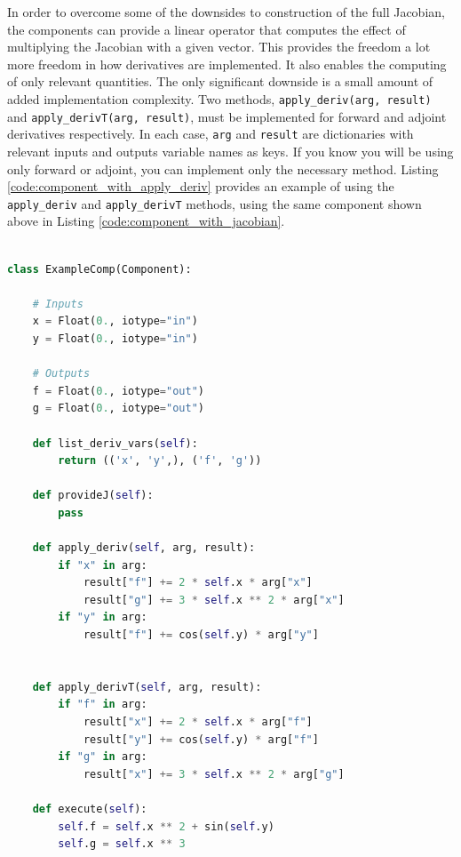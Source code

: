 \documentclass[]{aiaa-tc} %
\begin{document}
        In order to overcome some of the downsides to construction of the full Jacobian, the components can provide
        a linear operator that computes the effect of multiplying the Jacobian with a given vector. This provides
        the freedom a lot more freedom in how derivatives are implemented. It also enables the computing of only
        relevant quantities. The only significant downside is a small amount of added implementation complexity.
        Two methods, \texttt{apply\_deriv(arg, result)} and \texttt{apply\_derivT(arg, result)}, must be implemented
        for forward and adjoint derivatives respectively. In each case, \texttt{arg} and \texttt{result}
        are dictionaries with relevant inputs and outputs variable names as keys.
        If you know you will be using only forward or adjoint, you can implement only the
        necessary method. Listing \ref{code:component_with_apply_deriv} provides an example of
        using the \texttt{apply\_deriv} and \texttt{apply\_derivT} methods, using the same component shown above in
        Listing \ref{code:component_with_jacobian}.

\begin{minipage}{\linewidth}
\begin{lstlisting}[label=code:component_with_apply_deriv,caption=Example OpenMDAO
component with apply\_deriv and apply\_derivT methods implemented,
language=Python , basicstyle=\ttfamily\scriptsize,
           keywordstyle=\color{blue}\ttfamily,
           stringstyle=\color{red}\ttfamily, showstringspaces=false,
           commentstyle=\color{olive}\ttfamily]

class ExampleComp(Component):

    # Inputs
    x = Float(0., iotype="in")
    y = Float(0., iotype="in")

    # Outputs
    f = Float(0., iotype="out")
    g = Float(0., iotype="out")

    def list_deriv_vars(self):
        return (('x', 'y',), ('f', 'g'))

    def provideJ(self):
        pass

    def apply_deriv(self, arg, result):
        if "x" in arg:
            result["f"] += 2 * self.x * arg["x"]
            result["g"] += 3 * self.x ** 2 * arg["x"]
        if "y" in arg:
            result["f"] += cos(self.y) * arg["y"]


    def apply_derivT(self, arg, result):
        if "f" in arg:
            result["x"] += 2 * self.x * arg["f"]
            result["y"] += cos(self.y) * arg["f"]
        if "g" in arg:
            result["x"] += 3 * self.x ** 2 * arg["g"]

    def execute(self):
        self.f = self.x ** 2 + sin(self.y)
        self.g = self.x ** 3

\end{lstlisting}
\end{minipage}
\end{document}
